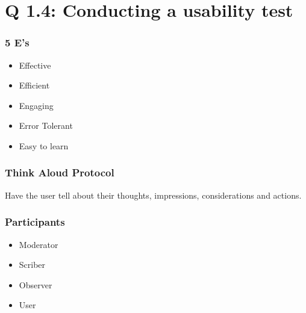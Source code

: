 
\section{Q 1.4: Conducting a usability test}

\begin{frame}
    \frametitle{5 E's}
    \begin{itemize}
        \item Effective
        \item Efficient
        \item Engaging
        \item Error Tolerant
        \item Easy to learn
    \end{itemize}
\end{frame}

\begin{frame}
    \frametitle{Think Aloud Protocol}
    Have the user tell about their thoughts, impressions, considerations and
    actions.
\end{frame}

\begin{frame}
    \frametitle{Participants}
    \begin{itemize}
        \item Moderator
        \item Scriber
        \item Observer
        \item User
    \end{itemize}
\end{frame}

